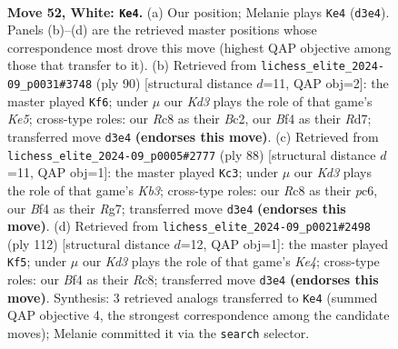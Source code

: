 \documentclass[11pt]{article}
\begin{document}
\clearpage

\begin{figure}[p]\centering
\begin{subfigure}{0.46\textwidth}\centering
\resizebox{\linewidth}{!}{%
\newchessgame
\chessboard[
  setfen={2R5/7r/rp4k1/8/3P1B2/1p1K4/8/8 w - - 0 52},
  showmover=false,
  pgfstyle=straightmove, color=movearrow, markmove={d3-e4}
]}
\caption{}
\end{subfigure}\hfill
\begin{subfigure}{0.46\textwidth}\centering
\resizebox{\linewidth}{!}{%
\newchessgame
\chessboard[
  setfen={5k2/3R4/8/p3K3/8/P1p4r/2B5/8 w - - 2 46},
  showmover=false,
  pgfstyle=straightmove, color=movearrow, markmove={e5-f6}
]}
\caption{}
\end{subfigure}
\\[4pt]
\begin{subfigure}{0.46\textwidth}\centering
\resizebox{\linewidth}{!}{%
\newchessgame
\chessboard[
  setfen={8/6R1/p1p5/5k2/2P1p2r/1K6/8/8 w - - 0 45},
  showmover=false,
  pgfstyle=straightmove, color=movearrow, markmove={b3-c3}
]}
\caption{}
\end{subfigure}\hfill
\begin{subfigure}{0.46\textwidth}\centering
\resizebox{\linewidth}{!}{%
\newchessgame
\chessboard[
  setfen={2R5/8/3r1p2/1k5p/4KP2/8/8/8 w - - 0 57},
  showmover=false,
  pgfstyle=straightmove, color=movearrow, markmove={e4-f5}
]}
\caption{}
\end{subfigure}
\caption{\textbf{Move 52, White: \texttt{Ke4}.} (a) Our position; Melanie plays \texttt{Ke4} (\texttt{d3e4}). Panels (b)--(d) are the retrieved master positions whose correspondence most drove this move (highest QAP objective among those that transfer to it). (b) Retrieved from \texttt{lichess\_elite\_2024-09\_p0031\#3748} (ply 90) [structural distance $d$=11, QAP obj=2]: the master played \texttt{Kf6}; under $\mu$ our \emph{Kd3} plays the role of that game's \emph{Ke5}; cross-type roles: our \emph{R}c8 as their \emph{B}c2, our \emph{B}f4 as their \emph{R}d7; transferred move \texttt{d3e4} \textbf{(endorses this move)}. (c) Retrieved from \texttt{lichess\_elite\_2024-09\_p0005\#2777} (ply 88) [structural distance $d$=11, QAP obj=1]: the master played \texttt{Kc3}; under $\mu$ our \emph{Kd3} plays the role of that game's \emph{Kb3}; cross-type roles: our \emph{R}c8 as their \emph{p}c6, our \emph{B}f4 as their \emph{R}g7; transferred move \texttt{d3e4} \textbf{(endorses this move)}. (d) Retrieved from \texttt{lichess\_elite\_2024-09\_p0021\#2498} (ply 112) [structural distance $d$=12, QAP obj=1]: the master played \texttt{Kf5}; under $\mu$ our \emph{Kd3} plays the role of that game's \emph{Ke4}; cross-type roles: our \emph{B}f4 as their \emph{R}c8; transferred move \texttt{d3e4} \textbf{(endorses this move)}. Synthesis: 3 retrieved analogs transferred to \texttt{Ke4} (summed QAP objective 4, the strongest correspondence among the candidate moves); Melanie committed it via the \texttt{search} selector.}
\label{fig:thought-m102}
\end{figure}
\end{document}
